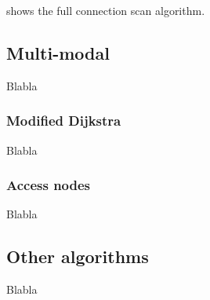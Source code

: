 	 shows the full connection scan algorithm. 

\subsection{Multi-modal}
	Blabla

\subsubsection{Modified Dijkstra}\label{modifiedDijkstra}
	Blabla

\subsubsection{Access nodes}\label{accessNodes}
	Blabla

\subsection{Other algorithms}
	Blabla
